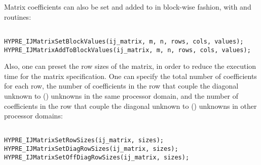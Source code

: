 Matrix coefficients can also be set and added to in block-wise fashion,
with  and  routines:

\begin{display}
\begin{verbatim}

HYPRE_IJMatrixSetBlockValues(ij_matrix, m, n, rows, cols, values);
HYPRE_IJMatrixAddToBlockValues(ij_matrix, m, n, rows, cols, values);

\end{verbatim}
\end{display}

Also, one can preset the row sizes of the matrix, in order to
reduce the execution time for the matrix specification.
One can specify the total number of coefficients for
each row, the number of coefficients in the row that couple the diagonal 
unknown to () unknowns in the same processor domain, and the
number of coefficients in the row that couple the diagonal unknown to
() unknowns in other processor domains:

\begin{display}
\begin{verbatim}

HYPRE_IJMatrixSetRowSizes(ij_matrix, sizes);
HYPRE_IJMatrixSetDiagRowSizes(ij_matrix, sizes);
HYPRE_IJMatrixSetOffDiagRowSizes(ij_matrix, sizes);

\end{verbatim}
\end{display}

